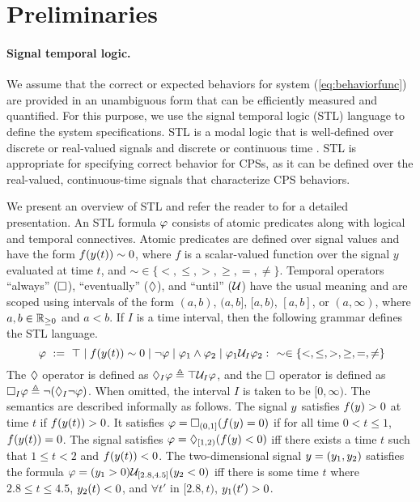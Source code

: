 \section{Preliminaries} \label{sec:prlim}
\paragraph{Signal temporal logic.} 

We assume that the correct or expected behaviors for system (\ref{eq:behaviorfunc}) are provided in an unambiguous form that can be efficiently measured and quantified. For this purpose, we use the signal temporal logic (STL) language to define the system specifications.
STL is a modal logic that is well-defined over discrete or real-valued signals and discrete or continuous time \cite{MalerN04}.
STL is appropriate for specifying correct behavior for CPSs, as it can be defined over the real-valued, continuous-time signals that characterize CPS behaviors. 

We present an overview of STL and refer the reader to \cite{MalerN04} for a detailed presentation.
An STL formula $\varphi$ consists of atomic predicates along with logical and temporal connectives.
Atomic predicates are defined over signal values and have the form $ f(y(t))\sim 0$, where $f$ is a scalar-valued function over the signal $y$ evaluated at time $t$, and $\sim \in \{ <,\leq, >, \geq, =, \neq \}$.
Temporal operators ``always'' ($\Box$), ``eventually'' ($\Diamond$), and ``until'' ($\mathcal{U}$) have the usual meaning and are scoped using intervals of the form $(a,b)$, $(a,b]$, $[a,b)$, $[a,b]$, or $(a,\infty)$, where 
$a,b\in \mathbb{R}_{\geq 0}$ and $a<b$. If $I$ is a time interval, then the following grammar defines the STL language.
\begin{equation}~\label{eqn:stl-gen}
\varphi ~ := ~ \top \; | \; f(y(t))\sim 0 \; | \; \neg \varphi \; | \;
\varphi_1 \wedge \varphi_2 \; | \; \varphi_1 \mathcal{U}_I \varphi_2:~~\sim \in \{ <,\leq,>,\geq,=,\neq \}
\end{equation}
The $\Diamond$ operator is defined as $\Diamond_I \varphi \triangleq \top \mathcal{U}_I \varphi$, and the $\Box$ operator is defined as $\Box_I \varphi \triangleq \neg (\Diamond _I \neg \varphi)$. When omitted, the interval $I$ is taken  to be $[0,\infty)$. The semantics are described informally as follows. The signal $y$ satisfies $f(y)> 0$ at time $t$ if $f(y(t))>0$. It satisfies $\varphi = \Box_{(0,1]}(f(y)=0)$ if for all time $0< t \leq 1$, $f(y(t))=0$. The signal satisfies $\varphi= \Diamond_{[1,2)}(f(y)<0)$ iff there exists a time $t$ such that $1\leq t < 2$ and $f(y(t))<0$. The two-dimensional signal $y=(y_1,y_2)$ satisfies the formula $\varphi=(y_1>0)\mathcal{U}_{[2.8,4.5]}(y_2<0)$ iff there is some time $t$ where $2.8 \leq t \leq 4.5$, $y_2(t)<0$, and $\forall t'$ in $[2.8,t)$, $y_1(t')>0$. 

